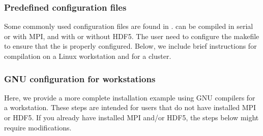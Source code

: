 \documentclass[letterpaper,10pt,english]{sphinxmanual}
\begin{document}
\subsubsection{Pre\sphinxhyphen{}defined configuration files}
\label{\detokenize{Base/GettingStarted:pre-defined-configuration-files}}
Some commonly used configuration files are found in .
 can be compiled in serial or with MPI, and with or without HDF5.
The user need to configure the  makefile to ensure that the  is properly configured.
Below, we include brief instructions for compilation on a Linux workstation and for a cluster.


\subsubsection{GNU configuration for workstations}
\label{\detokenize{Base/GettingStarted:gnu-configuration-for-workstations}}
Here, we provide a more complete installation example using GNU compilers for a workstation.
These steps are intended for users that do not have installed MPI or HDF5.
If you already have installed MPI and/or HDF5, the steps below might require modifications.
\end{document}
